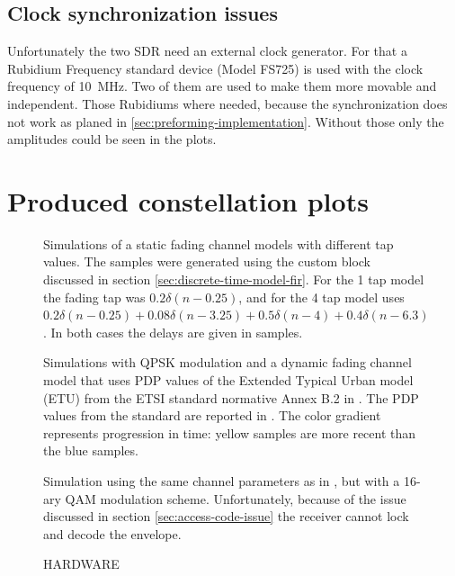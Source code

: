 \subsection{Clock synchronization issues}

Unfortunately the two SDR need an external clock generator. For that a Rubidium Frequency standard device (Model FS725) is used with the clock frequency of \SI{10}{\mega\hertz}. Two of them are used to make them more movable and independent. Those Rubidiums where needed, because the synchronization does not work as planed in \ref{sec:preforming-implementation}. 
Without those only the amplitudes could be seen in the plots. 


\section{Produced constellation plots}



\begin{figure}
	\centering
	\label{fig:qpsk-simulations-static}
	
	\caption{
		Simulations of a static fading channel models with different tap values. The samples were generated using the custom block discussed in section \ref{sec:discrete-time-model-fir}. For the 1 tap model the fading tap was \(0.2\delta(n - 0.25)\), and for the 4 tap model uses \(0.2 \delta(n - 0.25) + 0.08 \delta(n - 3.25) + 0.5 \delta(n - 4) + 0.4 \delta(n - 6.3)\). In both cases the delays are given in samples.
	}
\end{figure}
\newpage
\begin{figure}
	\centering
	
	\caption{
		Simulations with QPSK modulation and a dynamic fading channel model that uses PDP values of the Extended Typical Urban model (ETU) from the ETSI standard normative Annex B.2 in \cite{ETSI}. The PDP values from the standard are reported in . The color gradient represents progression in time: yellow samples are more recent than the blue samples.
		\label{fig:qpsk-simulations-dynamic}
	}
\end{figure}
\newpage
\begin{figure}
	\centering
	
	\caption{
		Simulation using the same channel parameters as in , but with a 16-ary QAM modulation scheme. Unfortunately, because of the issue discussed in section \ref{sec:access-code-issue} the receiver cannot lock and decode the envelope.
	}
\end{figure}
\begin{figure}
	\centering
	
	\caption{
		HARDWARE
	}
\end{figure}
\newpage
\restoregeometry

